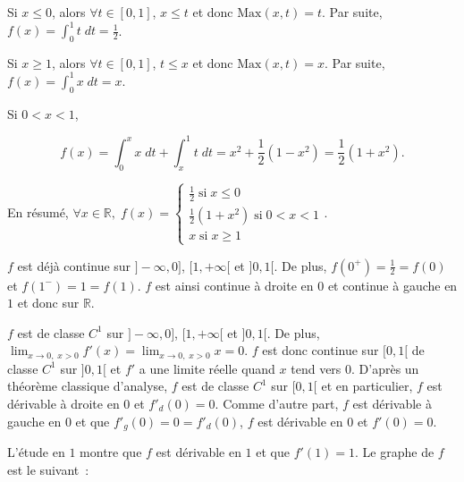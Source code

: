 \documentclass[11pt,a4paper]{article}
\newcommand{\Rr}{\mathbb{R}} \newcommand{\R}{\mathbb{R}}
\begin{document}
Si $x\leq0$, alors $\forall t\in[0,1]$, $x\leq t$ et donc $\mbox{Max}(x,t)=t$. Par suite, $f(x)=\int_{0}^{1}t\;dt=\frac{1}{2}$.

Si $x\geq1$, alors $\forall t\in[0,1]$, $t\leq x$ et donc $\mbox{Max}(x,t)=x$. Par suite, $f(x)=\int_{0}^{1}x\;dt=x$.

Si $0<x<1$,

$$f(x)=\int_{0}^{x}x\;dt+\int_{x}^{1}t\;dt=x^2+\frac{1}{2}(1-x^2)=\frac{1}{2}(1+x^2).$$

En résumé, $\forall x\in\Rr,\;f(x)=\left\{
\begin{array}{l}
\frac{1}{2}\;\mbox{si}\;x\leq0\\
\frac{1}{2}(1+x^2)\;\mbox{si}\;0<x<1\\
x\;\mbox{si}\;x\geq1
\end{array}
\right.$.

$f$ est déjà continue sur $]-\infty,0]$, $[1,+\infty[$ et $]0,1[$. De plus, $f(0^+)=\frac{1}{2}=f(0)$ et $f(1^-)=1=f(1)$. $f$ est ainsi continue à droite en $0$ et continue à gauche en $1$ et donc sur $\Rr$.

$f$ est de classe $C^1$ sur $]-\infty,0]$, $[1,+\infty[$ et $]0,1[$. De plus, $\lim_{x\rightarrow 0,\;x>0}f'(x)=\lim_{x\rightarrow 0,\;x>0}x=0$. $f$ est donc continue sur $[0,1[$ de classe $C^1$ sur $]0,1[$ et $f'$ a une limite réelle quand $x$ tend vers $0$. D'après un théorème classique d'analyse, $f$ est de classe $C^1$ sur $[0,1[$ et en particulier, $f$ est dérivable à droite en $0$ et ${f'}_{d}(0)=0$. Comme d'autre part, $f$ est dérivable à gauche en $0$ et que ${f'}_{g}(0)=0={f'}_{d}(0)$, $f$ est dérivable en $0$ et $f'(0)=0$.

L'étude en $1$ montre que $f$ est dérivable en $1$ et que $f'(1)=1$. Le graphe de $f$ est le suivant~:

\end{document}
